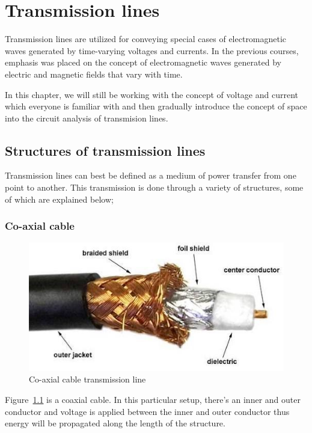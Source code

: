\chapter{Transmission lines}\label{lec:lec2}
Transmission lines are utilized for conveying special cases of electromagnetic waves generated by time-varying voltages and currents. In the previous courses, emphasis was placed on the concept of electromagnetic waves generated by electric and magnetic fields that vary with time.

In this chapter, we will still be working with the concept of voltage and current which everyone is familiar with and then gradually introduce the concept of space into the circuit analysis of transmision lines. 

\section{Structures of transmission lines}

Transmission lines can best be defined as a medium of power transfer from one point to another. This transmission is done through a variety of structures, some of which are explained below;

\subsection{Co-axial cable}	
\begin{figure}[h]
\centering
\includegraphics[scale=0.65]{./graphics/coaxial}
\caption{Co-axial cable transmission line}
\label{fig:coaxial}
\end{figure}

Figure~\ref{fig:coaxial} is a coaxial cable. In this particular setup, there’s an inner and outer conductor and voltage is applied between the inner and outer conductor thus energy will be propagated along the length of the structure.

